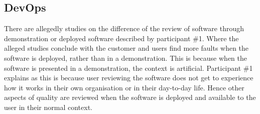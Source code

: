 





\subsection{DevOps} \label{sec:devops}
There are allegedly studies on the difference of the review of software through demonstration or deployed software described by participant \#1. Where the alleged studies conclude with the customer and users find more faults when the software is deployed, rather than in a demonstration. This is because when the software is presented in a demonstration, the context is artificial. Participant \#1 explains as this is because user reviewing the software does not get to experience how it works in their own organisation or in their day-to-day life. Hence other aspects of quality are reviewed when the software is deployed and available to the user in their normal context.

